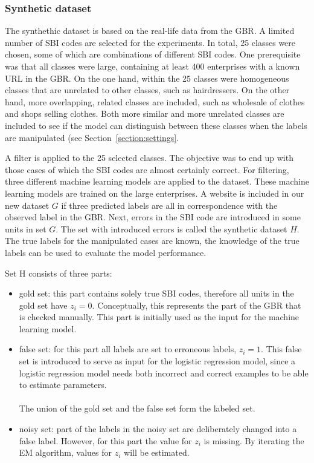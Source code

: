 \documentclass[12pt, a4paper, titlepage]{article}
\begin{document}
					\subsubsection{Synthetic dataset}
					\label{section:synthdata}
The synthethic dataset is based on the real-life data from the GBR. A limited number of SBI codes are selected for the experiments. In total, 25 classes were chosen, some of which are combinations of different SBI codes. One prerequisite was that all classes were large, containing at least 400 enterprises with a known URL in the GBR. On the one hand, within the 25 classes were homogeneous classes that are unrelated to other classes, such as hairdressers. On the other hand, more overlapping, related classes are included, such as wholesale of clothes and shops selling clothes. Both more similar and more unrelated classes are included to see if the model can distinguish between these classes when the labels are manipulated (see Section~\ref{section:settings}.

A filter is applied to the 25 selected classes. The objective was to end up with those cases of which the SBI codes are almost certainly correct. For filtering, three different machine learning models are applied to the dataset. These machine learning models are trained on the large enterprises. A website is included in our new dataset $G$ if three predicted labels are all in correspondence with the observed label in the GBR. Next, errors in the SBI code are introduced in some units in set $G$. The set with introduced errors is called the synthetic dataset $H$. The true labels for the manipulated cases are known, the knowledge of the true labels can be used to evaluate the model performance.

Set H consists of three parts:
\begin{itemize}
\item gold set: this part contains solely true SBI codes, therefore all units in the gold set have $z_i = 0$. Conceptually, this represents the part of the GBR that is checked manually. This part is initially used as the input for the machine learning model.
\item false set: for this part all labels are set to erroneous labels, $z_i = 1$. This false set is introduced to serve as input for the logistic regression model, since a logistic regression model needs both incorrect and correct examples to be able to estimate parameters.\\
\\
The union of the gold set and the false set form the labeled set.
\item noisy set: part of the labels in the noisy set are deliberately changed into a false label. However, for this part the value for $z_i$ is missing. By iterating the EM algorithm, values for $z_i$ will be estimated.
\end{itemize}
\end{document}
